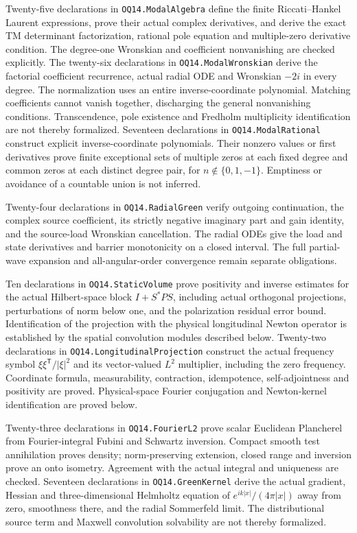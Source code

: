 Twenty-five declarations in \texttt{OQ14.ModalAlgebra} define the finite
Riccati--Hankel Laurent expressions, prove their actual complex
derivatives, and derive the exact TM determinant factorization, rational
pole equation and multiple-zero derivative condition. The degree-one
Wronskian and coefficient nonvanishing are checked explicitly. The
twenty-six declarations in \texttt{OQ14.ModalWronskian} derive the
factorial coefficient recurrence, actual radial ODE and Wronskian $-2i$
in every degree. The normalization uses an entire inverse-coordinate
polynomial. Matching coefficients cannot vanish together, discharging the
general nonvanishing conditions. Transcendence, pole existence and
Fredholm multiplicity identification are not thereby formalized.
Seventeen declarations in \texttt{OQ14.ModalRational} construct explicit
inverse-coordinate polynomials. Their nonzero values or first derivatives
prove finite exceptional sets of multiple zeros at each fixed degree and
common zeros at each distinct degree pair, for $n\notin\{0,1,-1\}$.
Emptiness or avoidance of a countable union is not inferred.

Twenty-four declarations in \texttt{OQ14.RadialGreen} verify outgoing
continuation, the complex source coefficient, its strictly negative
imaginary part and gain identity, and the source-load Wronskian
cancellation. The radial ODEs give the load and state derivatives and
barrier monotonicity on a closed interval. The full partial-wave
expansion and all-angular-order convergence remain separate obligations.

Ten declarations in \texttt{OQ14.StaticVolume} prove positivity and
inverse estimates for the actual Hilbert-space block $I+S^*PS$,
including actual orthogonal projections, perturbations of norm below one,
and the polarization residual error bound. Identification of the
projection with the physical longitudinal Newton operator is established
by the spatial convolution modules described below. Twenty-two declarations in
\texttt{OQ14.LongitudinalProjection} construct the actual frequency
symbol $\xi\xi^{\mathsf T}/|\xi|^2$ and its vector-valued $L^2$ multiplier,
including the zero frequency. Coordinate formula, measurability,
contraction, idempotence, self-adjointness and positivity are proved.
Physical-space Fourier
conjugation and Newton-kernel identification are proved below.

Twenty-three declarations in \texttt{OQ14.FourierL2} prove scalar
Euclidean Plancherel from Fourier-integral Fubini and Schwartz inversion.
Compact smooth test annihilation proves density; norm-preserving extension,
closed range and inversion prove an onto isometry. Agreement with the
actual integral and uniqueness are checked. Seventeen declarations in
\texttt{OQ14.GreenKernel} derive the actual gradient, Hessian and
three-dimensional Helmholtz equation of $e^{ik|x|}/(4\pi|x|)$ away from
zero, smoothness there, and the radial Sommerfeld limit. The
distributional source term and Maxwell convolution solvability are
not thereby formalized.

